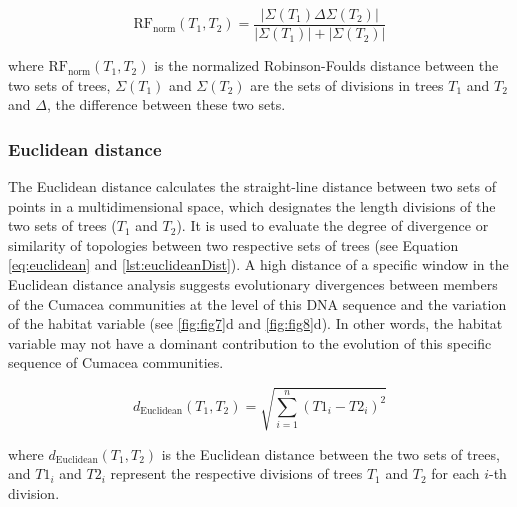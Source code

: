 \begin{equation}\label{eq:rf_norm}
    \text{RF}_{\text{norm}}(T_1, T_2) = \frac{| \Sigma(T_1) \Delta \Sigma(T_2) |}{| \Sigma(T_1) | + | \Sigma(T_2) |}
\end{equation}

where $\text{RF}_{\text{norm}}(T_1, T_2)$ is the normalized Robinson-Foulds distance between the two sets of trees, $\Sigma(T_1)$ and $\Sigma(T_2)$ are the sets of divisions in trees $T_1$ and $T_2$ and $ \Delta $, the difference between these two sets.

\subsubsection{Euclidean distance}\label{euclidean}
The Euclidean distance calculates the straight-line distance between two sets of points in a multidimensional space, which designates the length divisions of the two sets of trees ($T_1$ and $T_2$). It is used to evaluate the degree of divergence or similarity of topologies between two respective sets of trees (see Equation \eqref{eq:euclidean} and \autoref{lst:euclideanDist}).
A high distance of a specific window in the Euclidean distance analysis suggests evolutionary divergences between members of the Cumacea communities at the level of this DNA sequence and the variation of the habitat variable (see \autoref{fig:fig7}d and \autoref{fig:fig8}d). In other words, the habitat variable may not have a dominant contribution to the evolution of this specific sequence of Cumacea communities.

\begin{equation}\label{eq:euclidean}
    d_{\text{Euclidean}}(T_1, T_2) = \sqrt{\sum_{i=1}^{n} (T1_i - T2_i)^2}
\end{equation}

where $ d_{\text{Euclidean}}(T_1, T_2)$ is the Euclidean distance between the two sets of trees, and $T1_i$ and $T2_i$ represent the respective divisions of trees $T_1$ and $T_2$ for each $i$-th division.

